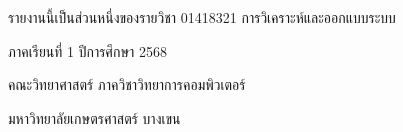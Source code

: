 \documentclass[a4paper,12pt]{memoir}
\newenvironment{thailang}
{\thaifont}
{}
\begin{document}
\begin{titlingpage}
    \vspace{1.5cm}
    
    {\begin{thailang}รายงานนี้เป็นส่วนหนึ่งของรายวิชา 01418321 การวิเคราะห์และออกแบบระบบ\end{thailang}}
    
    \vspace{0.2cm}
    
    {\begin{thailang}ภาคเรียนที่ 1 ปีการศึกษา 2568\end{thailang}}
    
    \vspace{0.2cm}
    
    {\begin{thailang}คณะวิทยาศาสตร์ ภาควิชาวิทยาการคอมพิวเตอร์\end{thailang}}
    
    \vspace{0.2cm}
    
    {\begin{thailang}มหาวิทยาลัยเกษตรศาสตร์ บางเขน\end{thailang}}
    
    \vfill
\end{titlingpage}

\frontmatter
\captionsthai

\tableofcontents
\clearpage

\listoffigures

\clearpage
\listoftables 
    
\mainmatter











\backmatter

   
\end{document}
